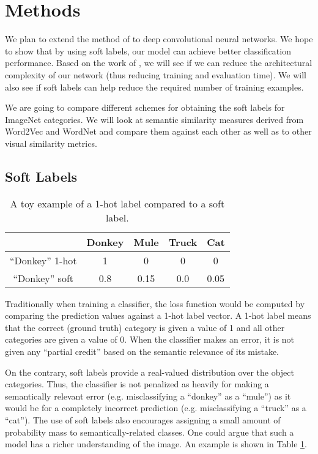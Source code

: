 \section{Methods}

We plan to extend the method of \cite{zhao2011large} to deep convolutional
neural networks.
We hope to show that by using soft labels, our model can achieve better
classification performance.
Based on the work of \cite{hinton2015distilling}, we will see if we can reduce
the architectural complexity of our network (thus reducing training and
evaluation time). We will also see if soft labels can help reduce the required
number of training examples.

We are going to compare different schemes for obtaining the soft labels for
ImageNet categories.
We will look at semantic similarity measures derived from Word2Vec and WordNet
and compare them against each other as well as to other visual similarity
metrics.



\subsection{Soft Labels}
\label{sec:soft_labels}

\begin{table}[!tb]
  \centering
  \begin{tabular}{|c|c|c|c|c|}
    \hline
      & Donkey & Mule & Truck & Cat \\
    \hline
      ``Donkey'' 1-hot & 1 & 0 & 0 & 0 \\
    \hline
      ``Donkey'' soft & 0.8 & 0.15 & 0.0 & 0.05 \\
    \hline
  \end{tabular}
  \caption{
    A toy example of a 1-hot label compared to a soft label.
  }
  \label{tbl:soft_labels}
\end{table}

Traditionally when training a classifier, the loss function would be computed
by comparing the prediction values against a 1-hot label vector.
A 1-hot label means that the correct (ground truth) category is given a value
of 1 and all other categories are given a value of 0.
When the classifier makes an error, it is not given any ``partial credit''
based on the semantic relevance of its mistake.

On the contrary, soft labels provide a real-valued distribution over
the object categories. Thus, the classifier is not penalized as
heavily for making a semantically relevant error (e.g. misclassifying
a ``donkey'' as a ``mule'') as it would be for a completely incorrect
prediction (e.g. misclassifying a ``truck'' as a ``cat''). The use of
soft labels also encourages assigning a small amount of probability
mass to semantically-related classes. One could argue that such a
model has a richer understanding of the image. An example is shown in
Table \ref{tbl:soft_labels}.



